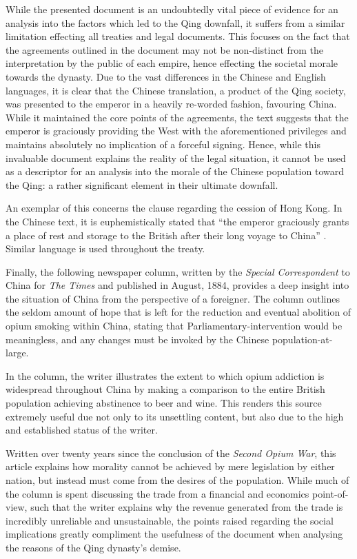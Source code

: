 \documentclass[a4paper,oneside]{article}
\begin{document}
While the presented document is an undoubtedly vital piece of evidence for an
analysis into the factors which led to the Qing downfall, it suffers from a
similar limitation effecting all treaties and legal documents. This focuses on
the fact that the agreements outlined in the document may not be non-distinct
from the interpretation by the public of each empire, hence effecting the
societal morale towards the dynasty.  Due to the vast differences in the Chinese
and English languages, it is clear that the Chinese translation, a product of
the Qing society, was presented to the emperor in a heavily re-worded fashion,
favouring China. While it maintained the core points of the agreements, the text
suggests that the emperor is graciously providing the West with the
aforementioned privileges and maintains absolutely no implication of a forceful
signing. Hence, while this invaluable document explains the reality of the legal
situation, it cannot be used as a descriptor for an analysis into the morale of
the Chinese population toward the Qing: a rather significant element in their
ultimate downfall.

An exemplar of this concerns the clause regarding the cession of Hong Kong. In
the Chinese text, it is euphemistically stated that ``the emperor graciously
grants a place of rest and storage to the British after their long voyage to
China'' \autocite{Zhang:2007}. Similar language is used throughout the treaty.

Finally, the following newspaper column, written by the \textit{Special
Correspondent} to China for \textit{The Times} and published in August, 1884,
provides a deep insight into the situation of China from the perspective of a
foreigner. The column outlines the seldom amount of hope that is left for the
reduction and eventual abolition of opium smoking within China, stating that
Parliamentary-intervention would be meaningless, and any changes must be invoked
by the Chinese population-at-large.


In the column, the writer illustrates the extent to which opium addiction is
widespread throughout China by making a comparison to the entire British
population achieving abstinence to beer and wine. This renders this source
extremely useful due not only to its unsettling content, but also due to the
high and established status of the writer.

Written over twenty years since the conclusion of the \textit{Second Opium
War}\footnotemark, this article explains how morality cannot be achieved by mere
legislation by either nation, but instead must come from the desires of the
population. While much of the column is spent discussing the trade from a
financial and economics point-of-view, such that the writer explains why the
revenue generated from the trade is incredibly unreliable and unsustainable, the
points raised regarding the social implications greatly compliment the
usefulness of the document when analysing the reasons of the Qing dynasty's
demise.
\end{document}
